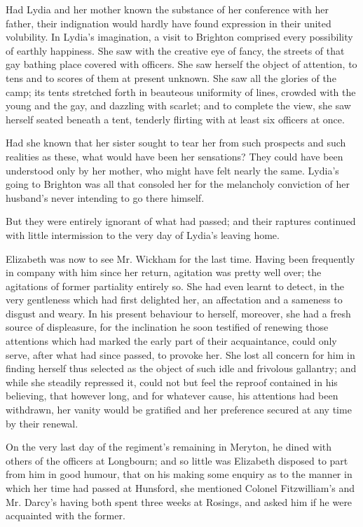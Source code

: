 Had Lydia and her mother known the substance of her
conference with her father, their indignation would hardly
have found expression in their united volubility. In
Lydia’s imagination, a visit to Brighton comprised every
possibility of earthly happiness. She saw with the creative
eye of fancy, the streets of that gay bathing place covered
with officers. She saw herself the object of attention, to
tens and to scores of them at present unknown. She saw
all the glories of the camp; its tents stretched forth in
beauteous uniformity of lines, crowded with the young
and the gay, and dazzling with scarlet; and to complete
the view, she saw herself seated beneath a tent, tenderly
flirting with at least six officers at once.

Had she known that her sister sought to tear her from
such prospects and such realities as these, what would
have been her sensations? They could have been understood
only by her mother, who might have felt nearly
the same. Lydia’s going to Brighton was all that
consoled her for the melancholy conviction of her husband’s
never intending to go there himself.

But they were entirely ignorant of what had passed;
and their raptures continued with little intermission to the
very day of Lydia’s leaving home.

Elizabeth was now to see Mr. Wickham for the last
time. Having been frequently in company with him since
her return, agitation was pretty well over; the agitations
of former partiality entirely so. She had even learnt to
detect, in the very gentleness which had first delighted
her, an affectation and a sameness to disgust and weary.
In his present behaviour to herself, moreover, she had
a fresh source of displeasure, for the inclination he soon
testified of renewing those attentions which had marked
the early part of their acquaintance, could only serve,
after what had since passed, to provoke her. She lost
all concern for him in finding herself thus selected as the
object of such idle and frivolous gallantry; and while she
steadily repressed it, could not but feel the reproof contained
in his believing, that however long, and for whatever
cause, his attentions had been withdrawn, her vanity
would be gratified and her preference secured at any time
by their renewal.

On the very last day of the regiment’s remaining in
Meryton, he dined with others of the officers at Longbourn;
and so little was Elizabeth disposed to part from him
in good humour, that on his making some enquiry as to
the manner in which her time had passed at Hunsford,
she mentioned Colonel Fitzwilliam’s and Mr. Darcy’s
having both spent three weeks at Rosings, and asked
him if he were acquainted with the former.

